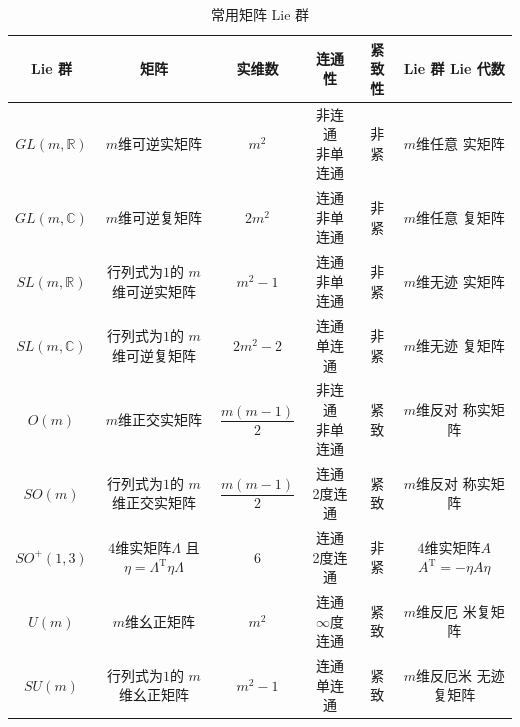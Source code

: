 \begin{table}[htb]
    \centering
    \caption{常用矩阵 Lie 群} \label{chlg:tab_groups}
    \begin{tabular}{|*6{c|}}
        \hline
         Lie 群 &矩阵 & 实维数 &连通性  & 紧致性 &  Lie 群 Lie 代数   \\        \hline
        $GL(m,\mathbb{R})$ & $m$维可逆实矩阵 & $m^2$  & \makecell{非连通\\非单连通 }
        & 非紧 & \makecell{$m$维任意\\ 实矩阵}   \\ \hline
        $GL(m,\mathbb{C})$& $m$维可逆复矩阵 & $2 m^2$ & \makecell{连通 \\非单连通 }
        & 非紧 & \makecell{$m$维任意\\ 复矩阵}  \\ \hline
        $SL(m,\mathbb{R})$ & \makecell{行列式为$1$的\\$m$维可逆实矩阵} & $m^2-1$  &  \makecell{连通 \\ 非单连通 }
        & 非紧 & \makecell{$m$维无迹\\ 实矩阵}  \\ \hline
        $SL(m,\mathbb{C})$ & \makecell{行列式为$1$的\\$m$维可逆复矩阵} & $2m^2-2$ & \makecell{连通\\单连通 }
        & 非紧 & \makecell{$m$维无迹\\ 复矩阵}  \\ \hline
        $O(m)$  & $m$维正交实矩阵 & $\dfrac{m(m-1)}{2}$  & \makecell{非连通\\非单连通 }
        & 紧致 & \makecell{$m$维反对\\ 称实矩阵} \\ \hline
        $SO(m)$ & \makecell{行列式为$1$的\\$m$维正交实矩阵} &$\dfrac{m(m-1)}{2}$ & \makecell{连通\\2度连通 }
        & 紧致 & \makecell{$m$维反对\\ 称实矩阵}  \\ \hline
        $SO^{+}(1,3)$ & \makecell{$4$维实矩阵$\Lambda$\\且$\eta=\Lambda^{\mathrm{T}} \eta \Lambda$} & $6$ & \makecell{连通\\2度连通 }
        & 非紧 & \makecell{$4$维实矩阵$A$\\$A^{\mathrm{T}}=- \eta A \eta $} \\ \hline
        $U(m)$ & $m$维幺正矩阵 & $m^2$ & \makecell{连通 \\$\infty$度连通 }
        & 紧致 &  \makecell{$m$维反厄\\ 米复矩阵} \\ \hline
        $SU(m)$ & \makecell{行列式为$1$的\\$m$维幺正矩阵} & $m^2-1$ & \makecell{连通\\单连通 }
        & 紧致 & \makecell{$m$维反厄米\\无迹复矩阵} \\ \hline
    \end{tabular}
\end{table}

